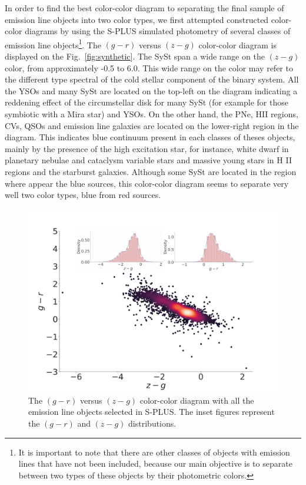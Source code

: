 \documentclass[fleqn,usenatbib]{mnras}
\begin{document}
In order to find the best color-color diagram to separating the final sample of
emission line objects into two color types, we first attempted constructed  color-color
diagrams by using the S-PLUS simulated photometry of several classes of emission line
objects\footnote{It is important to note that there are other classes of objects
with emission lines that have not been included, because our main objective is to
separate between two types of these objects by their photometric colors.}.
The $(g - r)$ versus $(z - g)$ color-color diagram is displayed on
the Fig.~\ref{fig:synthetic}. The SySt span a wide range on the $(z - g)$ color,
  from approximately -0.5 to 6.0. This wide range on the color may refer to the different
  type spectral of the cold stellar component of the binary system. All the YSOs and many
  SySt are located on the top-left on the diagram indicating a reddening effect of the
  circumstellar disk for many SySt (for example for those symbiotic with a Mira star)
  and YSOs. On the other hand, the PNe, HII regions, CVs, QSOs and emission line galaxies
  are located on the lower-right region in the diagram. This indicates blue continuum
  present in each classes of theses objects, mainly by the presence of the high excitation
  star, for instance, white dwarf in planetary nebulae and cataclysm variable stars and
  massive young stars in H II regions and the starburst galaxies. Although some SySt are located
  in the region where appear the blue sources, this color-color diagram seems to separate
  very well two color types, blue from red sources.

\begin{figure}
	\includegraphics[width=0.9\linewidth]{Figs/red-blue-colorObjects-gr-edit.jpg}
        \caption{The $(g - r)$ versus $(z - g)$ color-color diagram with all the emission line
          objects selected in S-PLUS. The inset figures represent the $(g - r)$ and  $(z - g)$
        distributions.}
    \label{fig:new-color}
\end{figure}
\end{document}
